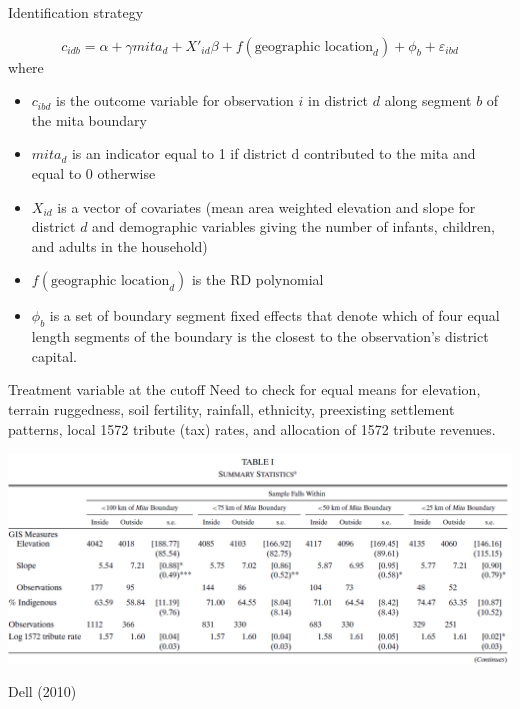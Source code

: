 \documentclass[notes,11pt, aspectratio=169]{beamer}
\begin{document}
\begin{frame}[label=id_strategy]{Identification strategy}

\[
c_{idb} = \alpha + \gamma mita_d + X'_{id} \beta + f(\text{geographic location}_d) + \phi_b + \varepsilon_{ibd}
\]
\pause
where 
\begin{itemize}
    \item $c_{ibd}$ is the outcome variable for observation $i$ in district $d$ along segment $b$ of the mita boundary
    \pause
    \item $mita_d$ is an indicator equal to 1 if district d contributed to the mita and equal to 0 otherwise   
    \pause
    \item  $X_{id}$ is a vector of covariates (mean area weighted elevation and slope for district $d$ and demographic variables giving the number of infants, children, and adults in the household)
    \pause
    \item $f(\text{geographic location}_d)$ is the RD polynomial
    \pause
    \item $\phi_b$ is a set of boundary segment fixed effects that denote which of four equal length segments of the boundary is the closest to the observation’s district capital.
\end{itemize}
\end{frame}

\begin{frame}{Treatment variable at the cutoff}
Need to check for equal means for elevation, terrain ruggedness, soil fertility, rainfall, ethnicity, preexisting settlement patterns, local 1572 tribute (tax) rates, and allocation of 1572 tribute revenues.
\begin{center}
    \includegraphics[scale = 0.5]{Picture3a.png}
    \caption{Dell (2010)}
\end{center}
\end{frame}
\end{document}
